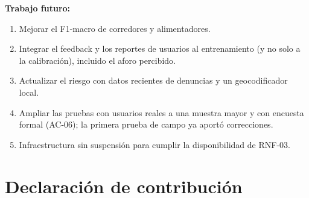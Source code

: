 \documentclass[11pt]{article}
\begin{document}
\textbf{Trabajo futuro:}
\begin{enumerate}
  \item Mejorar el F1-macro de corredores y alimentadores.
  \item Integrar el feedback y los reportes de usuarios al entrenamiento (y no solo a la calibración), incluido el aforo percibido.
  \item Actualizar el riesgo con datos recientes de denuncias y un geocodificador local.
  \item Ampliar las pruebas con usuarios reales a una muestra mayor y con encuesta formal (AC-06); la primera prueba de campo ya aportó correcciones.
  \item Infraestructura sin suspensión para cumplir la disponibilidad de RNF-03.
\end{enumerate}

\section{Declaración de contribución}
\end{document}
